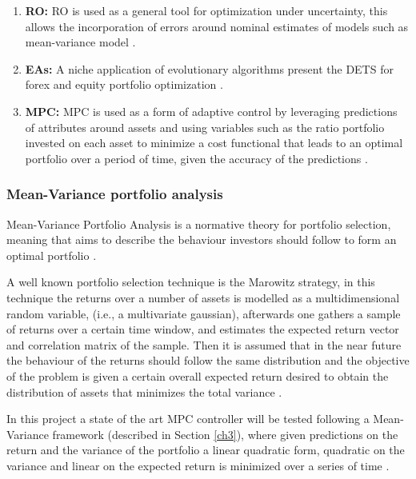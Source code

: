 \begin{enumerate}
    \item \textbf{\ac{RO}:} \ac{RO} is used as a general tool for optimization under uncertainty, this allows the incorporation of errors around nominal estimates of models such as mean-variance model \cite{robust_optimization_portfolio_selection_21}. 
    \item \textbf{\ac{EA}s:} A niche application of evolutionary algorithms present the \ac{DETS} for forex and equity portfolio optimization \cite{evolutionary_algorithm_22}.
    \item \textbf{\ac{MPC}:} \ac{MPC} is used as a form of adaptive control by leveraging predictions of attributes around assets and using variables such as the ratio portfolio invested on each asset to minimize a cost functional that leads to an optimal portfolio over a period of time, given the accuracy of the predictions \cite{MultiPeriod_PO_mpc}.
\end{enumerate}


\subsubsection{Mean-Variance portfolio analysis}
Mean-Variance Portfolio Analysis is a normative theory for portfolio selection, meaning that aims to describe the behaviour investors should follow to form an optimal portfolio \cite{investment_management_book_2010}.

A well known portfolio selection technique is the Marowitz strategy, in this technique the returns over a number of assets is modelled as a multidimensional random variable, (i.e., a multivariate gaussian), afterwards one gathers a sample of returns over a certain time window, and estimates the expected return vector and correlation matrix of the sample. Then it is assumed that in the near future the behaviour of the returns should follow the same distribution and the objective of the problem is given a certain overall expected return desired to obtain the distribution of assets that minimizes the total variance \cite{classical_portfolio_theory}.

In this project a state of the art \ac{MPC} controller will be tested following a Mean-Variance framework (described in Section \ref{ch3}), where given predictions on the return and the variance of the portfolio a linear quadratic form, quadratic on the variance and linear on the expected return is minimized over a series of time \cite{MultiPeriod_PO_mpc}.

